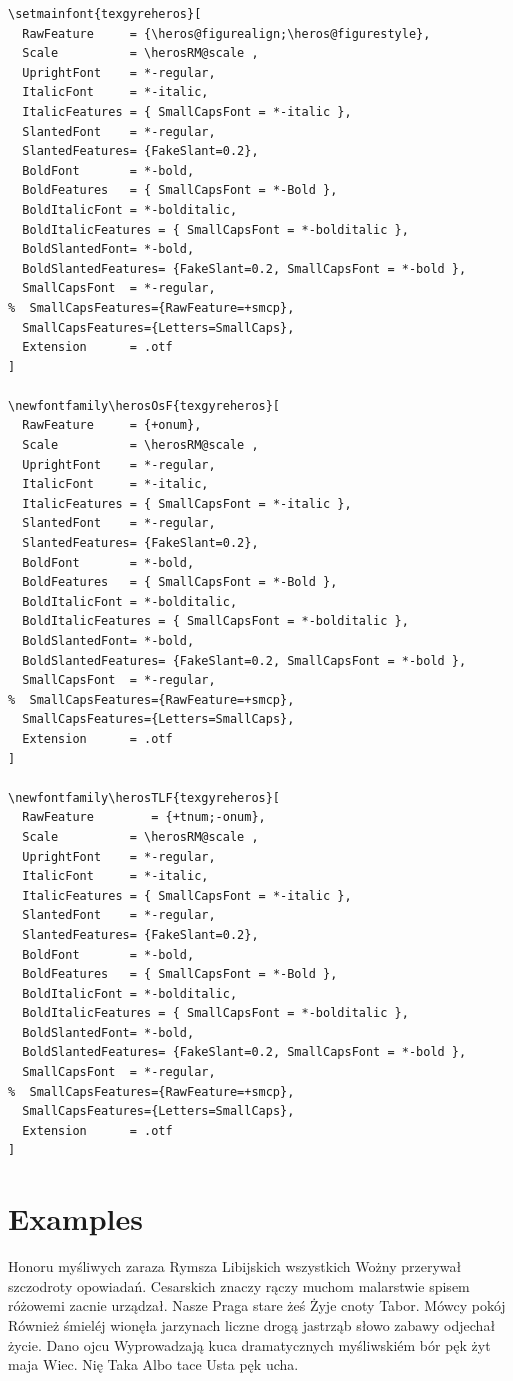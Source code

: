 \documentclass[ngerman,spanish,polish,english,a4paper]{article}
\begin{document}
\begin{verbatim}
\setmainfont{texgyreheros}[ 
  RawFeature     = {\heros@figurealign;\heros@figurestyle},
  Scale          = \herosRM@scale ,
  UprightFont    = *-regular,
  ItalicFont     = *-italic,
  ItalicFeatures = { SmallCapsFont = *-italic },
  SlantedFont    = *-regular,
  SlantedFeatures= {FakeSlant=0.2},
  BoldFont       = *-bold,
  BoldFeatures   = { SmallCapsFont = *-Bold },
  BoldItalicFont = *-bolditalic,
  BoldItalicFeatures = { SmallCapsFont = *-bolditalic },
  BoldSlantedFont= *-bold,
  BoldSlantedFeatures= {FakeSlant=0.2, SmallCapsFont = *-bold },
  SmallCapsFont  = *-regular,
%  SmallCapsFeatures={RawFeature=+smcp},
  SmallCapsFeatures={Letters=SmallCaps}, 
  Extension      = .otf  
]

\newfontfamily\herosOsF{texgyreheros}[
  RawFeature     = {+onum},
  Scale          = \herosRM@scale ,
  UprightFont    = *-regular,
  ItalicFont     = *-italic,
  ItalicFeatures = { SmallCapsFont = *-italic },
  SlantedFont    = *-regular,
  SlantedFeatures= {FakeSlant=0.2},
  BoldFont       = *-bold,
  BoldFeatures   = { SmallCapsFont = *-Bold },
  BoldItalicFont = *-bolditalic,
  BoldItalicFeatures = { SmallCapsFont = *-bolditalic },
  BoldSlantedFont= *-bold,
  BoldSlantedFeatures= {FakeSlant=0.2, SmallCapsFont = *-bold },
  SmallCapsFont  = *-regular,
%  SmallCapsFeatures={RawFeature=+smcp},
  SmallCapsFeatures={Letters=SmallCaps}, 
  Extension      = .otf  
]

\newfontfamily\herosTLF{texgyreheros}[
  RawFeature        = {+tnum;-onum},
  Scale          = \herosRM@scale ,
  UprightFont    = *-regular,
  ItalicFont     = *-italic,
  ItalicFeatures = { SmallCapsFont = *-italic },
  SlantedFont    = *-regular,
  SlantedFeatures= {FakeSlant=0.2},
  BoldFont       = *-bold,
  BoldFeatures   = { SmallCapsFont = *-Bold },
  BoldItalicFont = *-bolditalic,
  BoldItalicFeatures = { SmallCapsFont = *-bolditalic },
  BoldSlantedFont= *-bold,
  BoldSlantedFeatures= {FakeSlant=0.2, SmallCapsFont = *-bold },
  SmallCapsFont  = *-regular,
%  SmallCapsFeatures={RawFeature=+smcp},
  SmallCapsFeatures={Letters=SmallCaps}, 
  Extension      = .otf  
]
\end{verbatim}


\newpage
\section{Examples}

Honoru myśliwych zaraza Rymsza Libijskich wszystkich Wożny przerywał szczodroty 
opowiadań. Cesarskich znaczy rączy muchom malarstwie spisem różowemi zacnie 
urządzał. Nasze Praga stare żeś Żyje cnoty Tabor. Mówcy pokój Również śmieléj 
wionęła jarzynach liczne drogą jastrząb słowo zabawy odjechał życie. Dano 
ojcu Wyprowadzają kuca dramatycznych myśliwskiém bór pęk żyt maja Wiec. Nię 
Taka Albo tace Usta pęk ucha.
\end{document}
